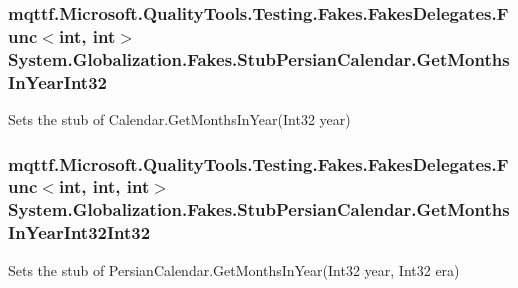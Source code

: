 \hypertarget{class_system_1_1_globalization_1_1_fakes_1_1_stub_persian_calendar_a569b4139909e88ea0068cad36eaadf4d}{
\subsubsection[{Get\-Months\-In\-Year\-Int32}]{\setlength{\rightskip}{0pt plus 5cm}mqttf.\-Microsoft.\-Quality\-Tools.\-Testing.\-Fakes.\-Fakes\-Delegates.\-Func$<$int, int$>$ System.\-Globalization.\-Fakes.\-Stub\-Persian\-Calendar.\-Get\-Months\-In\-Year\-Int32}}\label{class_system_1_1_globalization_1_1_fakes_1_1_stub_persian_calendar_a569b4139909e88ea0068cad36eaadf4d}


Sets the stub of Calendar.\-Get\-Months\-In\-Year(\-Int32 year)

\hypertarget{class_system_1_1_globalization_1_1_fakes_1_1_stub_persian_calendar_aede945a44e0bfe44b817016b205e61ab}{
\subsubsection[{Get\-Months\-In\-Year\-Int32\-Int32}]{\setlength{\rightskip}{0pt plus 5cm}mqttf.\-Microsoft.\-Quality\-Tools.\-Testing.\-Fakes.\-Fakes\-Delegates.\-Func$<$int, int, int$>$ System.\-Globalization.\-Fakes.\-Stub\-Persian\-Calendar.\-Get\-Months\-In\-Year\-Int32\-Int32}}\label{class_system_1_1_globalization_1_1_fakes_1_1_stub_persian_calendar_aede945a44e0bfe44b817016b205e61ab}


Sets the stub of Persian\-Calendar.\-Get\-Months\-In\-Year(\-Int32 year, Int32 era)

